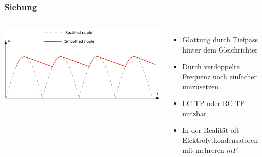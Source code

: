 \begin{frame}
    \frametitle{Siebung}
    \begin{columns}[c]
        \begin{center}
            \includegraphics[width=1\textwidth]{a05/Smoothed_ripple.png}\\
            \tiny \hyperlink{refs}{\cite{wm}}
        \end{center}
    \begin{itemize}
			\item Glättung durch Tiefpass hinter dem Gleichrichter
			\item Durch verdoppelte Frequenz noch einfacher umzusetzen
			\item LC-TP oder RC-TP nutzbar
			\item In der Realität oft Elektrolytkondensatoren mit mehreren $mF$
    \end{itemize}
    \end{columns}
\end{frame}


